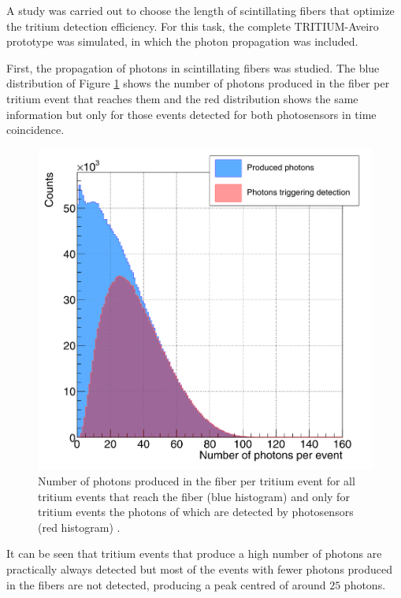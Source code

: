 A study was carried out to choose the length of scintillating fibers that optimize the tritium detection efficiency. For this task, the complete TRITIUM-Aveiro prototype was simulated, in which the photon propagation was included.

First, the propagation of photons in scintillating fibers was studied. The blue distribution of Figure \ref{fig:PhotonsFibersYesNoPhotosensors} shows the number of photons produced in the fiber per tritium event that reaches them and the red distribution shows the same information but only for those events detected for both photosensors in time coincidence.

\begin{figure}[h]
\centering
\includegraphics[scale=0.3]{Figures/8SimulationsResults/81TRITIUMDesign/813Length/CollectionPhotonsInFibers.png}
\caption{Number of photons produced in the fiber per tritium event for all tritium events that reach the fiber (blue histogram) and only for tritium events the photons of which are detected by photosensors (red histogram) \cite{SimulationPaperCarlos}.\label{fig:PhotonsFibersYesNoPhotosensors}}
\end{figure}

It can be seen that tritium events that produce a high number of photons are practically always detected but most of the events with fewer photons produced in the fibers are not detected, producing a peak centred of around $25$ photons.  

